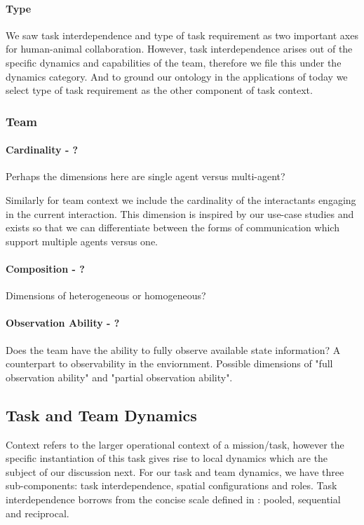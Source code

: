 \documentclass[letterpaper, 10 pt, conference]{ieeeconf}  %
\theoremstyle{definition}
\begin{document}
\paragraph{Type}
We saw task interdependence and type of task requirement as two important axes for human-animal collaboration.
However, task interdependence arises out of the specific dynamics and capabilities of the team, therefore we file this under the dynamics category.
And to ground our ontology in the applications of today we select type of task requirement as the other component of task context.

\subsubsection{Team}

\paragraph{Cardinality - ?}
Perhaps the dimensions here are single agent versus multi-agent?

Similarly for team context we include the cardinality of the interactants engaging in the current interaction.
This dimension is inspired by our use-case studies and exists so that we can differentiate between the forms of communication which support multiple agents versus one.

\paragraph{Composition - ?}
Dimensions of heterogeneous or homogeneous?

\paragraph{Observation Ability - ?}
Does the team have the ability to fully observe available state information? A counterpart to observability in the enviornment. Possible dimensions of "full observation ability" and "partial observation ability".

\subsection{Task and Team Dynamics}

Context refers to the larger operational context of a mission/task, however the specific instantiation of this task gives rise to local dynamics which are the subject of our discussion next.
For our task and team dynamics, we have three sub-components: task interdependence, spatial configurations and roles.
Task interdependence borrows from the concise scale defined in \cite{Phillips2015}: pooled, sequential and reciprocal.
\end{document}
